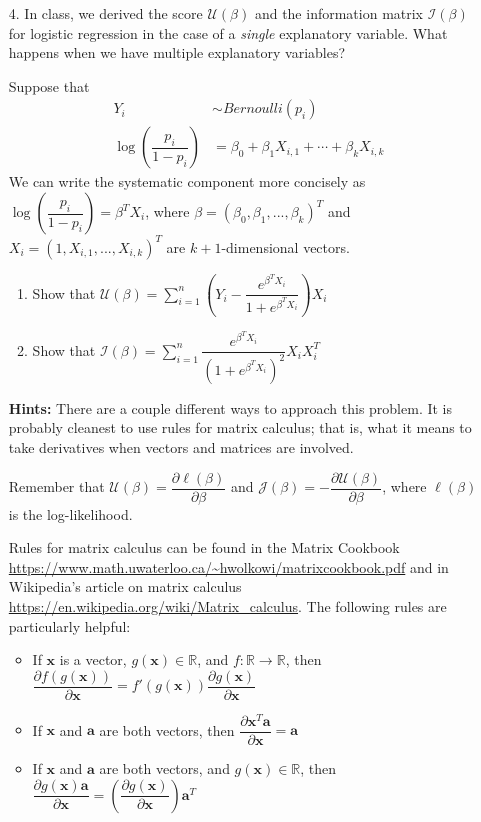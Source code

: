 \documentclass[11pt]{article}
\begin{document}
\begin{enumerate}
\item[4.] In class, we derived the score $\mathcal{U}(\beta)$ and the information matrix $\mathcal{I}(\beta)$ for logistic regression in the case of a \textit{single} explanatory variable. What happens when we have multiple explanatory variables?

Suppose that
\begin{align*}
Y_i &\sim Bernoulli(p_i)\\
\log \left( \dfrac{p_i}{1 - p_i} \right) &= \beta_0 + \beta_1 X_{i,1} + \cdots + \beta_k X_{i,k}
\end{align*}
We can write the systematic component more concisely as $\log \left( \dfrac{p_i}{1 - p_i} \right) = \beta^T X_i$, where $\beta = (\beta_0, \beta_1, ..., \beta_k)^T$ and $X_i = (1, X_{i,1}, ..., X_{i,k})^T$ are $k+1$-dimensional vectors.

\begin{enumerate}
\item Show that $\mathcal{U}(\beta) = \sum \limits_{i=1}^n \left( Y_i - \dfrac{e^{\beta^T X_i}}{1 + e^{\beta^T X_i}} \right) X_i$
\item Show that $\mathcal{I}(\beta) = \sum \limits_{i=1}^n \dfrac{e^{\beta^T X_i}}{(1 + e^{\beta^T X_i})^2} X_i X_i^T$
\end{enumerate}

\textbf{Hints:} There are a couple different ways to approach this problem. It is probably cleanest to use rules for matrix calculus; that is, what it means to take derivatives when vectors and matrices are involved. 

Remember that $\mathcal{U}(\beta) = \dfrac{\partial \ell(\beta)}{\partial \beta}$ and $\mathcal{J}(\beta) = -\dfrac{\partial \mathcal{U}(\beta)}{\partial \beta}$, where $\ell(\beta)$ is the log-likelihood.

Rules for matrix calculus can be found in the Matrix Cookbook \url{https://www.math.uwaterloo.ca/~hwolkowi/matrixcookbook.pdf} and in Wikipedia's article on matrix calculus \url{https://en.wikipedia.org/wiki/Matrix_calculus}. The following rules are particularly helpful:
\begin{itemize}
\item If $\mathbf{x}$ is a vector, $g(\mathbf{x}) \in \mathbb{R}$, and $f: \mathbb{R} \to \mathbb{R}$, then $\dfrac{\partial f(g(\mathbf{x}))}{\partial \mathbf{x}} = f'(g(\mathbf{x})) \dfrac{\partial g(\mathbf{x})}{\partial \mathbf{x}}$
\item If $\mathbf{x}$ and $\mathbf{a}$ are both vectors, then $\dfrac{\partial \mathbf{x}^T \mathbf{a}}{\partial \mathbf{x}} = \mathbf{a}$
\item If $\mathbf{x}$ and $\mathbf{a}$ are both vectors, and $g(\mathbf{x}) \in \mathbb{R}$, then $\dfrac{\partial g(\mathbf{x}) \mathbf{a}}{\partial \mathbf{x}} = \left( \dfrac{\partial g(\mathbf{x})}{\partial \mathbf{x}} \right) \mathbf{a}^T$
\end{itemize}


\end{enumerate}
\end{document}
